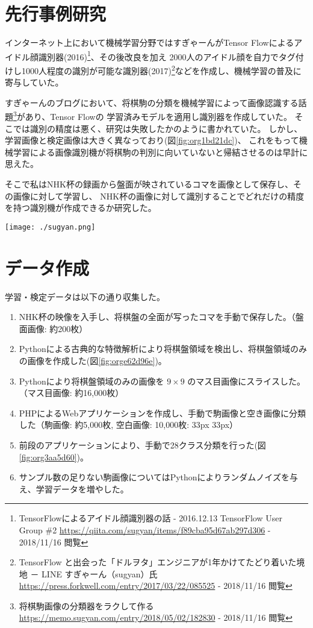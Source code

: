 \documentclass[uplatex, dvipdfmx]{jsarticle}
\begin{document}
\begin{multicols*}{2}
\section{先行事例研究}
\label{sec:org055d329}
インターネット上において機械学習分野ではすぎゃーんがTensor Flowによるアイドル顔識別器(2016)\footnote{TensorFlowによるアイドル顔識別器の話 - 2016.12.13 TensorFlow User Group \#2
\url{https://qiita.com/sugyan/items/f89cba95d67ab297d306} - 2018/11/16 閲覧}、その後改良を加え
2000人のアイドル顔を自力でタグ付けし1000人程度の識別が可能な識別器(2017)\footnote{TensorFlow と出会った「ドルヲタ」エンジニアが1年かけてたどり着いた境地 － LINE すぎゃーん（sugyan）氏
\url{https://press.forkwell.com/entry/2017/03/22/085525} - 2018/11/16 閲覧}などを作成し、機械学習の普及に寄与していた。

すぎゃーんのブログにおいて、将棋駒の分類を機械学習によって画像認識する話題\footnote{将棋駒画像の分類器をラクして作る
\url{https://memo.sugyan.com/entry/2018/05/02/182830} - 2018/11/16 閲覧}があり、Tensor Flowの
学習済みモデルを適用し識別器を作成していた。
そこでは識別の精度は悪く、研究は失敗したかのように書かれていた。
しかし、学習画像と検定画像は大きく異なっており(図\ref{fig:org1bd21dc})、
これをもって機械学習による画像識別機が将棋駒の判別に向いていないと帰結させるのは早計に思えた。

そこで私はNHK杯の録画から盤面が映されているコマを画像として保存し、その画像に対して学習し、
NHK杯の画像に対して識別することでどれだけの精度を持つ識別機が作成できるか研究した。

\begin{center}
\texttt{[image: ./sugyan.png]}
\end{center}
\section{データ作成}
\label{sec:org545c546}
学習・検定データは以下の通り収集した。
\begin{enumerate}
\item NHK杯の映像を入手し、将棋盤の全面が写ったコマを手動で保存した。（盤面画像: 約200枚）
\item Pythonによる古典的な特徴解析により将棋盤領域を検出し、将棋盤領域のみの画像を作成した(図\ref{fig:orge62d96e})。
\item Pythonにより将棋盤領域のみの画像を \(9 \times 9\) のマス目画像にスライスした。（マス目画像: 約16,000枚）
\item PHPによるWebアプリケーションを作成し、手動で駒画像と空き画像に分類した（駒画像: 約5,000枚, 空白画像: 10,000枚: 33px \texttimes{} 33px）
\item 前段のアプリケーションにより、手動で28クラス分類を行った(図\ref{fig:org3aa5d60})。
\item サンプル数の足りない駒画像についてはPythonによりランダムノイズを与え、学習データを増やした。
\end{enumerate}


\end{multicols*}
\end{document}
